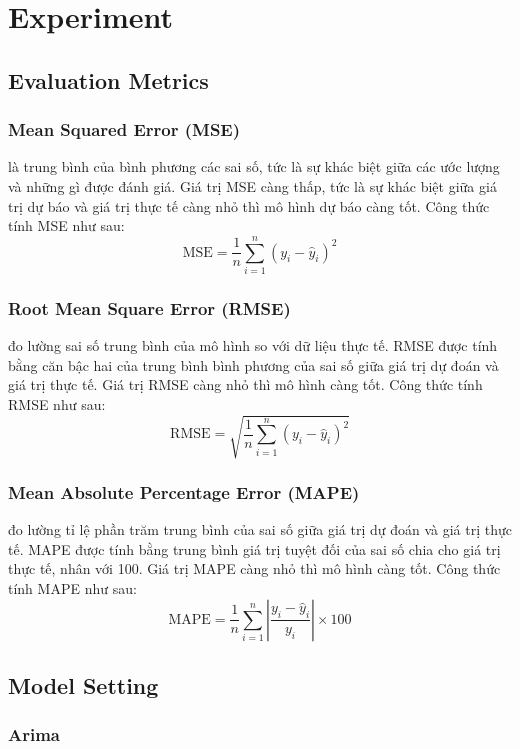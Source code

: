 \documentclass[conference]{IEEEtran}
\begin{document}
\section{Experiment}
\subsection{Evaluation Metrics} 
\subsubsection{Mean Squared Error (MSE)} là trung bình của bình phương các sai số, tức là sự khác biệt giữa các ước lượng và những gì được đánh giá. Giá trị MSE càng thấp, tức là sự khác biệt giữa giá trị dự báo và giá trị thực tế càng nhỏ thì mô hình dự báo càng tốt. Công thức tính MSE như sau:
\[
\text{MSE} = \frac{1}{n} \sum_{i=1}^{n} (y_i - \hat{y}_i)^2
\]
\subsubsection{Root Mean Square Error (RMSE)} đo lường sai số trung bình của mô hình so với dữ liệu thực tế. RMSE được tính bằng căn bậc hai của trung bình bình phương của sai số giữa giá trị dự đoán và giá trị thực tế. Giá trị RMSE càng nhỏ thì mô hình càng tốt. Công thức tính RMSE như sau:
\[
\text{RMSE} = \sqrt{\frac{1}{n} \sum_{i=1}^{n} (y_i - \hat{y}_i)^2}
\]
\subsubsection{Mean Absolute Percentage Error (MAPE)} đo lường tỉ lệ phần trăm trung bình của sai số giữa giá trị dự đoán và giá trị thực tế. MAPE được tính bằng trung bình giá trị tuyệt đối của sai số chia cho giá trị thực tế, nhân với 100. Giá trị MAPE càng nhỏ thì mô hình càng tốt. Công thức tính MAPE như sau:
\[
\text{MAPE} = \frac{1}{n} \sum_{i=1}^{n} \left| \frac{y_i - \hat{y}_i}{y_i} \right| \times 100
\]

\subsection{Model Setting}

\subsubsection{Arima}
\end{document}
